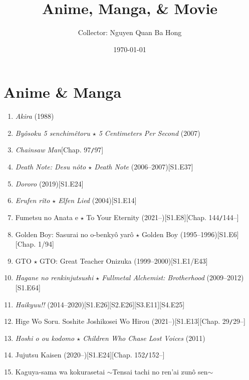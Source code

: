 \documentclass{article}
\title{Anime, Manga, {\large\&} Movie}
\author{Collector: Nguyen Quan Ba Hong}
\date{\today}
\begin{document}
\maketitle
\tableofcontents


\section{Anime \& Manga}
\begin{enumerate}
    \item \textit{Akira} (1988)
    \item \textit{By\^osoku 5 senchimêtoru $\star$ 5 Centimeters Per Second} (2007)
    \item \textit{Chainsaw Man}\hfill[Chap. 97\texttt{/}97]
    \item \textit{Death Note: Desu n\^oto $\star$ Death Note} (2006--2007)\hfill[S1.E37]
    \item \textit{Dororo} (2019)\hfill[S1.E24]
    \item \textit{Erufen r\^ito $\star$ Elfen Lied} (2004)\hfill[S1.E14]
    \item Fumetsu no Anata e $\star$ To Your Eternity (2021--)\hfill[S1.E8][Chap. 144\texttt{/}144--]
    \item Golden Boy: Sasurai no o-benky\^o yar\^o $\star$ Golden Boy (1995--1996)\hfill[S1.E6][Chap. 1/94]
    \item GTO $\star$ GTO: Great Teacher Onizuka (1999--2000)\hfill[S1.E1/E43]
    \item \textit{Hagane no renkinjutsushi $\star$ Fullmetal Alchemist: Brotherhood} (2009--2012)\hfill[S1.E64]
    \item \textit{Haikyuu!!} (2014--2020)\hfill[S1.E26][S2.E26][S3.E11][S4.E25]
    \item Hige Wo Soru. Soshite Joshikosei Wo Hirou (2021--)\hfill[S1.E13][Chap. 29\texttt{/}29--]
    \item \textit{Hoshi o ou kodomo $\star$ Children Who Chase Lost Voices} (2011)
    \item Jujutsu Kaisen (2020--)\hfill[S1.E24][Chap. 152\texttt{/}152--]
    \item Kaguya-sama wa kokurasetai $\sim$Tensai tachi no ren'ai zun\^o sen$\sim$
    

\end{enumerate}
\end{document}
